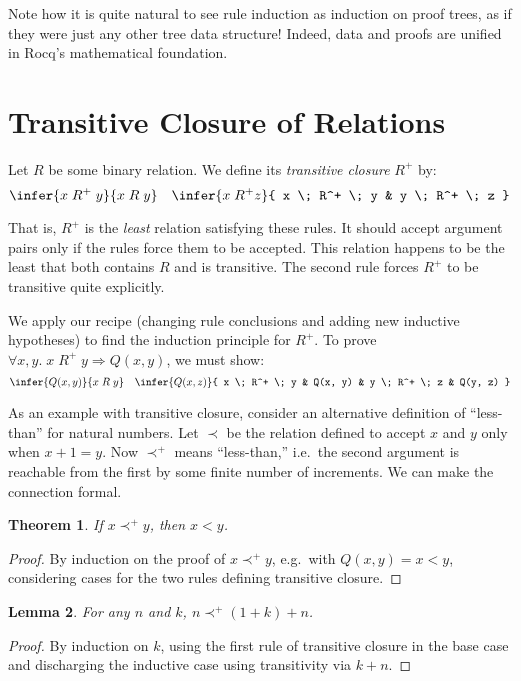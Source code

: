 \documentclass{amsbook}
\newtheorem{theorem}{Theorem}[chapter]
\newtheorem{lemma}[theorem]{Lemma}
\theoremstyle{definition}
\theoremstyle{remark}
\numberwithin{section}{chapter}
\numberwithin{equation}{chapter}
\begin{document}
Note how it is quite natural to see rule induction as induction on proof trees, as if they were just any other tree data structure!
Indeed, data and proofs are unified in Rocq's mathematical foundation.

\section{Transitive Closure of Relations}

Let $R$ be some binary relation.  We define its \emph{transitive closure} $R^+$ by:
$$\infer{x \; R^+ \; y}{
  x \; R \; y
}
\quad \infer{x \; R^+ z}{
  x \; R^+ \; y
  & y \; R^+ \; z
}$$

That is, $R^+$ is the \emph{least} relation satisfying these rules.
It should accept argument pairs only if the rules force them to be accepted.
This relation happens to be the least that both contains $R$ and is transitive.
The second rule forces $R^+$ to be transitive quite explicitly.

We apply our recipe (changing rule conclusions and adding new inductive hypotheses) to find the induction principle for $R^+$.
To prove $\forall x, y. \; x \; R^+ \; y \Rightarrow Q(x, y)$, we must show:
$$\infer{Q(x, y)}{
  x \; R \; y
}
\quad \infer{Q(x, z)}{
  x \; R^+ \; y
  & Q(x, y)
  & y \; R^+ \; z
  & Q(y, z)
}$$

As an example with transitive closure, consider an alternative definition of ``less-than'' for natural numbers.
Let $\prec$ be the relation defined to accept $x$ and $y$ only when $x + 1 = y$.
Now $\prec^+$ means ``less-than,'' i.e.\ the second argument is reachable from the first by some finite number of increments.
We can make the connection formal.

\begin{theorem}
  If $x \prec^+ y$, then $x < y$.
\end{theorem}
\begin{proof}
  By induction on the proof of $x \prec^+ y$, e.g.\ with $Q(x, y) = x < y$, considering cases for the two rules defining transitive closure.
\end{proof}

\begin{lemma}\label{lt_lt''}
  For any $n$ and $k$, $n \prec^+ (1+k) + n$.
\end{lemma}
\begin{proof}
  By induction on $k$, using the first rule of transitive closure in the base case and discharging the inductive case using transitivity via $k + n$.
\end{proof}
\end{document}
